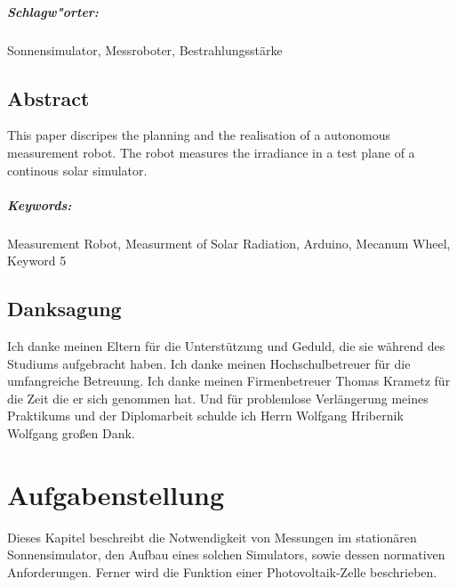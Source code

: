 \documentclass[a4paper,bibtotoc,oneside]{scrbook}
\begin{document}
\paragraph*{Schlagw"orter:} Sonnensimulator, Messroboter, Bestrahlungsstärke


\newpage

\section*{Abstract}\thispagestyle{empty}
This paper discripes the planning and the realisation of a autonomous measurement robot. The robot measures the irradiance in a test plane of a continous solar simulator.
\\ \vfill
\paragraph*{Keywords:} Measurement Robot, Measurment of Solar Radiation, Arduino, Mecanum Wheel, Keyword 5
\newpage

\section*{Danksagung}\thispagestyle{empty}
Ich danke meinen Eltern für die Unterstützung und Geduld, die sie während des Studiums aufgebracht haben.
Ich danke meinen Hochschulbetreuer für die umfangreiche Betreuung.
Ich danke meinen Firmenbetreuer Thomas Krametz für die Zeit die er sich genommen hat.
Und für problemlose Verlängerung meines Praktikums und der Diplomarbeit schulde ich Herrn Wolfgang Hribernik Wolfgang großen Dank.
\newpage

\tableofcontents\thispagestyle{empty}
\newpage

\setcounter{page}{1}

\chapter{Aufgabenstellung}

Dieses Kapitel beschreibt die Notwendigkeit von Messungen im stationären Sonnensimulator, den Aufbau eines solchen Simulators, sowie dessen normativen Anforderungen. Ferner wird die Funktion einer Photovoltaik-Zelle beschrieben.
\end{document}
